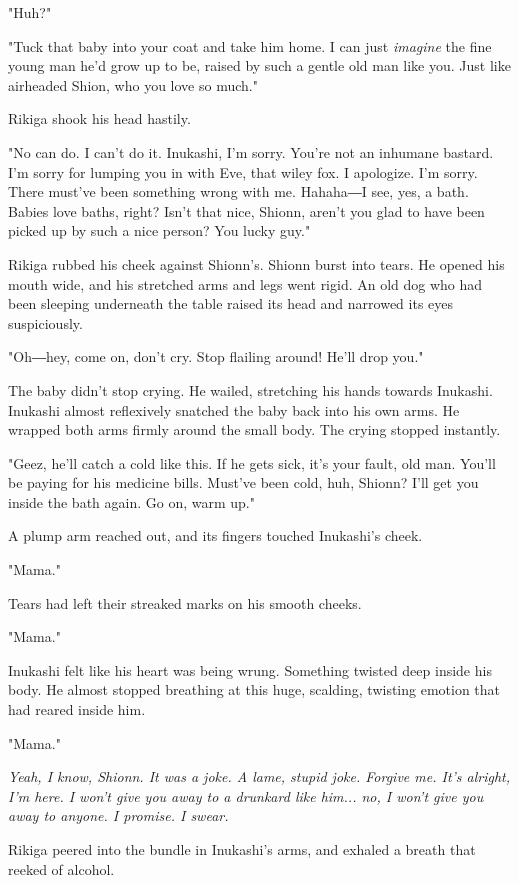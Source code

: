 "Huh?"

"Tuck that baby into your coat and take him home. I can just \emph{imagine} the
fine young man he'd grow up to be, raised by such a gentle old man like
you. Just like airheaded Shion, who you love so much."

Rikiga shook his head hastily.

"No can do. I can't do it. Inukashi, I'm sorry. You're not an inhumane
bastard. I'm sorry for lumping you in with Eve, that wiley fox. I
apologize. I'm sorry. There must've been something wrong with me.
Hahaha―I see, yes, a bath. Babies love baths, right? Isn't that nice,
Shionn, aren't you glad to have been picked up by such a nice person?
You lucky guy."

Rikiga rubbed his cheek against Shionn's. Shionn burst into tears. He
opened his mouth wide, and his stretched arms and legs went rigid. An
old dog who had been sleeping underneath the table raised its head and
narrowed its eyes suspiciously.

"Oh―hey, come on, don't cry. Stop flailing around! He'll drop you."

The baby didn't stop crying. He wailed, stretching his hands towards
Inukashi. Inukashi almost reflexively snatched the baby back into his
own arms. He wrapped both arms firmly around the small body. The crying
stopped instantly.

"Geez, he'll catch a cold like this. If he gets sick, it's your fault,
old man. You'll be paying for his medicine bills. Must've been cold,
huh, Shionn? I'll get you inside the bath again. Go on, warm up."

A plump arm reached out, and its fingers touched Inukashi's cheek.

"Mama."

Tears had left their streaked marks on his smooth cheeks.

"Mama."

Inukashi felt like his heart was being wrung. Something twisted deep
inside his body. He almost stopped breathing at this huge, scalding,
twisting emotion that had reared inside him.

"Mama."

\emph{Yeah, I know, Shionn. It was a joke. A lame, stupid joke. Forgive me.
It's alright, I'm here. I won't give you away to a drunkard like him...
no, I won't give you away to anyone. I promise. I swear.}

\mybreak

Rikiga peered into the bundle in Inukashi's arms, and exhaled a breath
that reeked of alcohol.

